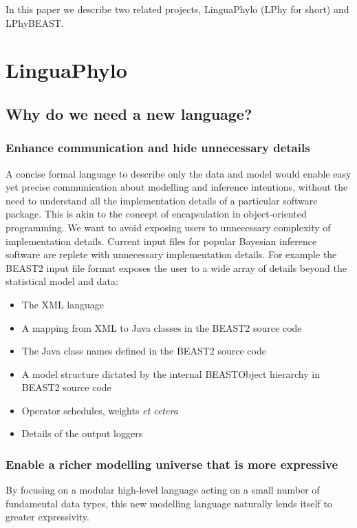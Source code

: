 \documentclass[oneside]{article}
\begin{document}
In this paper we describe two related projects, LinguaPhylo (LPhy for
short) and LPhyBEAST.  

\section{LinguaPhylo}

\subsection{Why do we need a new language?}


\subsubsection{Enhance communication and hide unnecessary details}

A concise formal language to describe only the data and model would enable easy yet precise communication about modelling and inference intentions, without the need to understand all the implementation details of a particular software package. This is akin to the concept of encapsulation in object-oriented programming. We want to avoid exposing users to unnecessary complexity of implementation details. 
Current input files for popular Bayesian inference software are replete with unnecessary implementation details.
For example the BEAST2 input file format exposes the user to a wide array of details beyond the statistical model and data:
\begin{itemize}
\item The XML language
\item A mapping from XML to Java classes in the BEAST2 source code
\item The Java class names defined in the BEAST2 source code
\item A model structure dictated by the internal BEASTObject hierarchy in BEAST2 source code
\item Operator schedules, weights {\it et cetera}
\item Details of the output loggers
\end{itemize}

\subsubsection{Enable a richer modelling universe that is more expressive}

By focusing on a modular high-level language acting on a small number of fundamental data types, this new modelling language naturally lends itself to greater expressivity.
\end{document}
